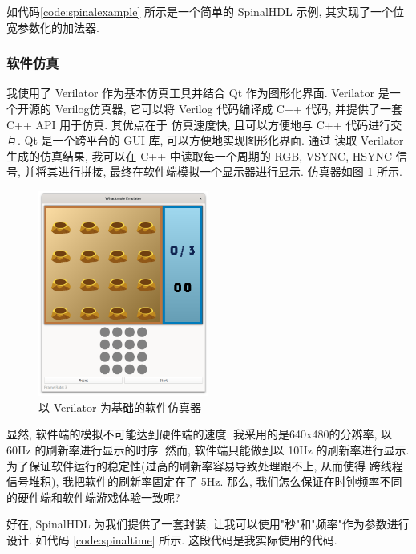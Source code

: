 

如代码\ref{code:spinalexample} 所示是一个简单的 SpinalHDL 示例, 其实现了一个位宽参数化的加法器. 



\subsubsection{软件仿真}

我使用了 Verilator 作为基本仿真工具并结合 Qt 作为图形化界面. 
Verilator 是一个开源的 Verilog仿真器, 它可以将 Verilog 代码编译成 C++ 代码, 并提供了一套 C++ API 用于仿真. 其优点在于
仿真速度快, 且可以方便地与 C++ 代码进行交互. Qt 是一个跨平台的 GUI 库, 可以方便地实现图形化界面. 通过
读取 Verilator 生成的仿真结果, 我可以在 C++ 中读取每一个周期的 RGB, VSYNC, HSYNC 信号, 并将其进行拼接, 
最终在软件端模拟一个显示器进行显示. 仿真器如图 \ref{fig:emulator} 所示. 

\begin{figure}
    \centering
    \includegraphics[width=0.5\textwidth]{res/img/emulator.png}
    \caption{以 Verilator 为基础的软件仿真器}
    \label{fig:emulator}
\end{figure}

显然, 软件端的模拟不可能达到硬件端的速度. 我采用的是640x480的分辨率, 以 60Hz 的刷新率进行显示的时序. 然而, 
软件端只能做到以 10Hz 的刷新率进行显示. 为了保证软件运行的稳定性(过高的刷新率容易导致处理跟不上, 从而使得
跨线程信号堆积), 我把软件的刷新率固定在了 5Hz. 那么, 我们怎么保证在时钟频率不同的硬件端和软件端游戏体验一致呢? 

好在, SpinalHDL 为我们提供了一套封装, 让我可以使用"秒"和"频率"作为参数进行设计. 如代码 \ref{code:spinaltime} 所示. 
这段代码是我实际使用的代码. 

